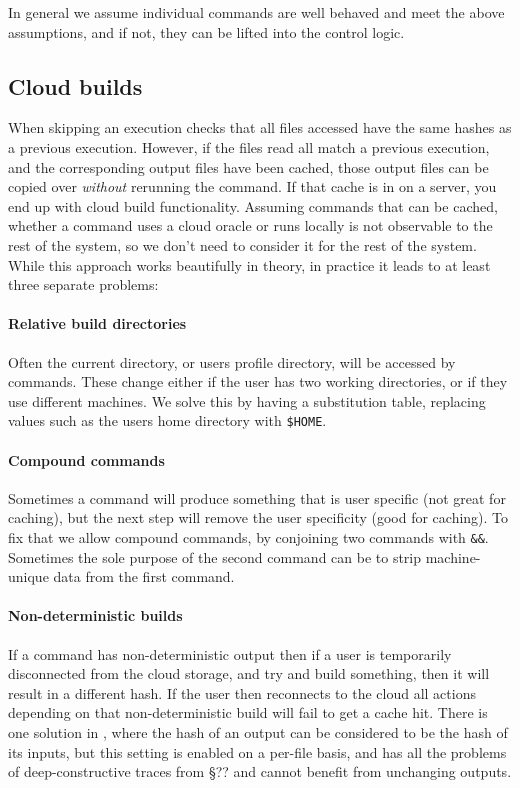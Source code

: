 In general we assume individual commands are well behaved and meet the above assumptions, and if not, they can be lifted into the control logic.

\subsection{Cloud builds}
\label{sec:cloud_builds}

When skipping an execution \Rattle checks that all files accessed have the same hashes as a previous execution. However, if the files read all match a previous execution, and the corresponding output files have been cached, those output files can be copied over \emph{without} rerunning the command. If that cache is in on a server, you end up with cloud build functionality. Assuming commands that can be cached, whether a command uses a cloud oracle or runs locally is not observable to the rest of the system, so we don't need to consider it for the rest of the system. While this approach works beautifully in theory, in practice it leads to at least three separate problems:

\paragraph{Relative build directories} Often the current directory, or users profile directory, will be accessed by commands. These change either if the user has two working directories, or if they use different machines. We solve this by having a substitution table, replacing values such as the users home directory with \texttt{\$HOME}.

\paragraph{Compound commands} Sometimes a command will produce something that is user specific (not great for caching), but the next step will remove the user specificity (good for caching). To fix that we allow compound commands, by conjoining two commands with \texttt{\&\&}. Sometimes the sole purpose of the second command can be to strip machine-unique data from the first command.

\paragraph{Non-deterministic builds} If a command has non-deterministic output then if a user is temporarily disconnected from the cloud storage, and try and build something, then it will result in a different hash. If the user then reconnects to the cloud all actions depending on that non-deterministic build will fail to get a cache hit. There is one solution in \Rattle, where the hash of an output can be considered to be the hash of its inputs, but this setting is enabled on a per-file basis, and has all the problems of deep-constructive traces from \cite{build_systems_a_la_carte} \S?? and cannot benefit from unchanging outputs.

